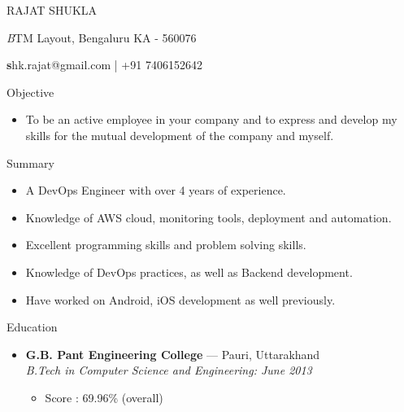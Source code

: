 \documentclass[a4paper,11pt,oneside]{article}
\makeatletter
\newcommand{\name}{RAJAT SHUKLA}
\newcommand{\addr}{BTM Layout, Bengaluru KA - 560076}
\newcommand{\contact}{shk.rajat@gmail.com | +91 7406152642}
\newcommand{\bigname}[1]{
  \begin{center}\fontfamily{phv}\selectfont\Huge#1\end{center}
}
\newcommand{\bignamenew}[1]{
  \begin{center}\selectfont\Huge#1\end{center}
}
\newcommand{\addrinfo}[1]{
  \begin{center}\selectfont\small\textit#1\end{center}
}
\newcommand{\contactinfo}[1]{
  \begin{center}\selectfont\small\textbf#1\end{center}
}
\newcommand{\resdescpara}[1]{
  \vspace{-5pt}
\item
  #1
}
\newenvironment{ressection}[1]{
  \vspace{4pt}
         {\fontfamily{phv}\selectfont\Large#1}
         \begin{itemize}
           \vspace{3pt}
}{
         \end{itemize}
}
\newcommand{\resitem}[1]{
  \vspace{-4pt}
\item \begin{flushleft} #1 \end{flushleft}
}
\newcommand{\ressubitem}[1]{
  \vspace{-1pt}
\item \begin{flushleft} #1 \end{flushleft}
}
\newcommand{\resbigitem}[3]{
  \vspace{-5pt}
\item
  \textbf{#1} --- #2 \\
  \textit{#3}
}
\newenvironment{ressubsec}[3]{
  \resbigitem{#1}{#2}{#3}
  \vspace{-2pt}
  \begin{itemize}
}{
  \end{itemize}
}
\makeatother
\begin{document}

\bigname{\name}

\vspace{2 pt}
\addrinfo{\addr}

\contactinfo{\contact}
\vspace{8 pt}


\begin{ressection}{Objective}
  \resdescpara{To be an active employee in your company and to express and develop my skills for the mutual development of the company and myself.}
\end{ressection}


\begin{ressection}{Summary}
  \resitem{A DevOps Engineer with over 4 years of experience.}
  \resitem{Knowledge of AWS cloud, monitoring tools, deployment and automation.}
  \resitem{Excellent programming skills and problem solving skills.}
  \resitem{Knowledge of DevOps practices, as well as Backend development.}
  \resitem{Have worked on Android, iOS development as well previously.}
\end{ressection}



\begin{ressection}{Education}
  \begin{ressubsec}{G.B. Pant Engineering College}{Pauri, Uttarakhand}{B.Tech in Computer Science and Engineering: June 2013}
    \ressubitem{Score : 69.96\% (overall)}
  \end{ressubsec}
\end{ressection}

\end{document}
